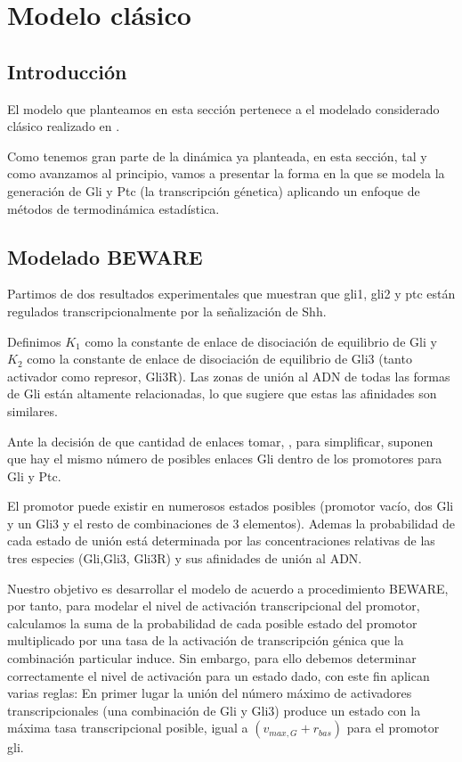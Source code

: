 
\chapter{Modelo clásico}

\label{ch:modelo_clasico}

\section{Introducción}
El modelo que planteamos en esta sección pertenece a el modelado considerado clásico realizado en \cite{schaffer}.

Como tenemos gran parte de la dinámica ya planteada, en esta sección, tal y como avanzamos al principio, vamos a presentar la forma en la que se modela la generación de Gli y Ptc (la transcripción génetica) aplicando un enfoque de métodos de termodinámica estadística.

\section{Modelado BEWARE}
 
 
 
 Partimos de dos resultados experimentales que muestran que gli1, gli2 y ptc están regulados transcripcionalmente por la señalización de Shh.
 
  Definimos $K_1$ como la constante de enlace de disociación de equilibrio de Gli y $K_2$ como la constante de enlace de disociación de equilibrio de Gli3 (tanto activador como represor, Gli3R). Las zonas de unión al ADN de todas las formas de Gli están altamente relacionadas, lo que sugiere que estas las afinidades son similares.
  
  Ante la decisión de que cantidad de enlaces tomar, \cite{schaffer}, para simplificar, suponen que hay el mismo número de posibles enlaces Gli dentro de los
  promotores para Gli y Ptc.
  
  
  El promotor puede existir en numerosos
  estados posibles (promotor vacío, dos Gli  y un Gli3 y el resto de combinaciones de 3 elementos). Ademas la probabilidad de cada estado de unión está determinada por las concentraciones relativas de las tres especies (Gli,Gli3, Gli3R) y sus afinidades de unión al ADN. 
  
  
  Nuestro objetivo es desarrollar el modelo de acuerdo a procedimiento BEWARE, por tanto, para modelar el nivel de activación transcripcional del promotor, calculamos la suma de la probabilidad de cada posible estado del promotor multiplicado por una tasa de la activación de transcripción génica que la combinación particular
  induce.
  Sin embargo, para ello debemos determinar correctamente  el nivel de activación para un estado dado, con este fin \cite{schaffer,saha} aplican varias reglas:
  En primer lugar la unión del número máximo de activadores transcripcionales (una combinación de Gli y Gli3) produce un estado con la máxima tasa transcripcional  posible, igual a $(v_{max,G} + r_{bas})$ para el promotor gli.
  
